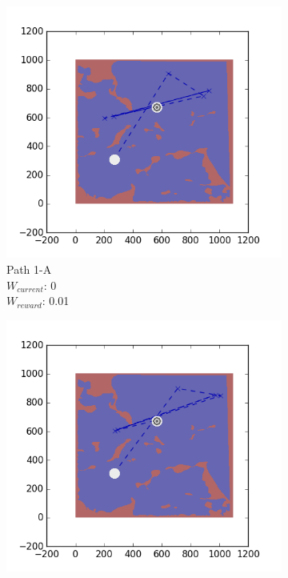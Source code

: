 \documentclass{tamuccthesis}
\begin{document}
\begin{figure}[H]
    \centering
    \begin{subfigure}[b]{0.24\textwidth}
        \centering
            \includegraphics[width=\textwidth,trim={4cm 3cm 2cm 3cm},clip]{EXP3RG_PathAa_-1_-1_0_0d01.png}
        \caption{{\small Path 1-A \\ $W_{current}$: 0 \\ $W_{reward}$: 0.01}}    
        \label{fig:Path_1-A_upReward_noWork}
    \end{subfigure}
    \begin{subfigure}[b]{0.24\textwidth}  
        \centering 
        \includegraphics[width=\textwidth,trim={4cm 3cm 2cm 3cm},clip]{EXP3RG_PathAa_-1_-1_-1_0d01.png}

\end{subfigure}
\end{figure}
\end{document}
